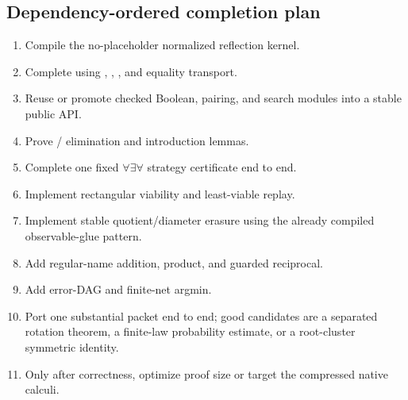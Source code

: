 \begin{center}
\end{center}

\subsection{Dependency-ordered completion plan}

\begin{enumerate}
\item Compile the no-placeholder normalized reflection kernel.
\item Complete  using , , , and equality transport.
\item Reuse or promote checked Boolean, pairing, and search modules into a stable public API.
\item Prove / elimination and introduction lemmas.
\item Complete one fixed \(\forall\exists\forall\) strategy certificate end to end.
\item Implement rectangular viability and least-viable replay.
\item Implement stable quotient/diameter erasure using the already compiled observable-glue pattern.
\item Add regular-name addition, product, and guarded reciprocal.
\item Add error-DAG and finite-net argmin.
\item Port one substantial packet end to end; good candidates are a separated rotation theorem, a finite-law probability estimate, or a root-cluster symmetric identity.
\item Only after correctness, optimize proof size or target the compressed native calculi.
\end{enumerate}

